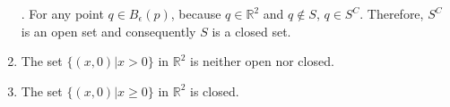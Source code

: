 \documentclass{homework}
\begin{document}
\begin{problem}{5}
\begin{enumerate}
. For any point $q \in B_{\epsilon}(p)$, because $q \in \mathbb{R}^2$ and $q \notin S$, $q \in S^C$. Therefore, $S^C$ is an open set and consequently $S$ is a closed set. \QED

\item The set $\{(x, 0) | x > 0\}$ in $\mathbb{R}^2$ is neither open nor closed.

\item The set $\{(x, 0) | x \geq 0\}$ in $\mathbb{R}^2$ is closed.

\end{enumerate}
\end{problem}
\end{document}
